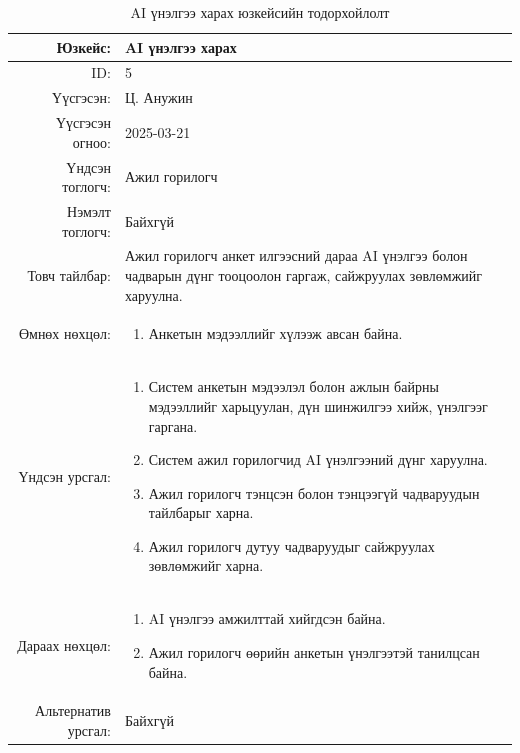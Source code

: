 \begin{longtable}{|r|p{11.5cm}|}
    \caption{AI үнэлгээ харах юзкейсийн тодорхойлолт}
    \label{table:usecase5}\\ \hline
    {Юзкейс:} & {AI үнэлгээ харах}\\ \hline
    {ID:} & {5}\\ \hline
    {Үүсгэсэн:} & {Ц. Анужин}\\ \hline
    {Үүсгэсэн огноо:} & {2025-03-21}\\ \hline
    {Үндсэн тоглогч:} & {Ажил горилогч}\\ \hline
    {Нэмэлт тоглогч:} & {Байхгүй}\\ \hline
    {Товч тайлбар:} & {Ажил горилогч анкет илгээсний дараа AI үнэлгээ болон чадварын дүнг тооцоолон гаргаж, сайжруулах зөвлөмжийг харуулна.}\\ \hline
    {Өмнөх нөхцөл:} & {\begin{enumerate}[nosep]
        \item Анкетын мэдээллийг хүлээж авсан байна.
    \end{enumerate}}\\ \hline
    {Үндсэн урсгал:} & {\begin{enumerate}[nosep]
        \item Систем анкетын мэдээлэл болон ажлын байрны мэдээллийг харьцуулан, дүн шинжилгээ хийж, үнэлгээг гаргана.
        \item Систем ажил горилогчид AI үнэлгээний дүнг харуулна.
        \item Ажил горилогч тэнцсэн болон тэнцээгүй чадваруудын тайлбарыг харна.
        \item Ажил горилогч дутуу чадваруудыг сайжруулах зөвлөмжийг харна.
    \end{enumerate}}\\ \hline
    {Дараах нөхцөл:} & {\begin{enumerate}[nosep]
        \item AI үнэлгээ амжилттай хийгдсэн байна.
        \item Ажил горилогч өөрийн анкетын үнэлгээтэй танилцсан байна.
    \end{enumerate}}\\ \hline
    {Альтернатив урсгал:} & {Байхгүй}\\ \hline
\end{longtable}

